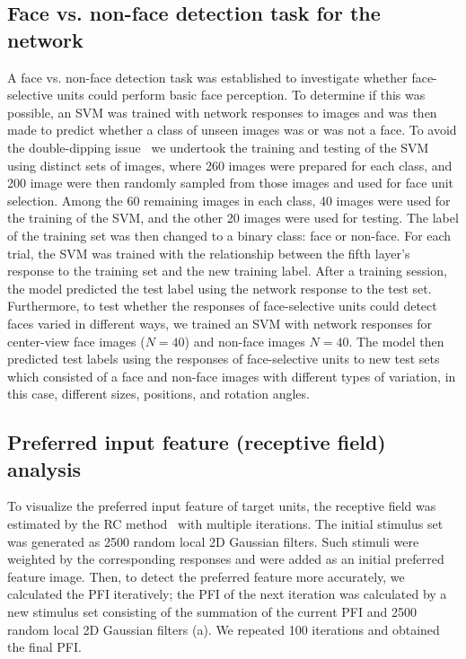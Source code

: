 \documentclass[final,3p,times,twocolumn]{elsarticle}
\begin{document}
\subsection{Face vs. non-face detection task for the network}
A face vs. non-face detection task was established to investigate whether face-selective units could perform basic face perception.
To determine if this was possible, an SVM was trained with network responses to images and was then made to predict whether a class of unseen images was or was not a face.
To avoid the double-dipping issue~\cite{kriegeskorte2009circular} we undertook the training and testing of the SVM using distinct sets of images, 
where 260 images were prepared for each class, 
and 200 image were then randomly sampled from those images and used for face unit selection.
Among the 60 remaining images in each class, 40 images were used for the training of the SVM, 
and the other 20 images were used for testing.
The label of the training set was then changed to a binary class: face or non-face.
For each trial, the SVM was trained with the relationship between the fifth layer's response to the training set and the new training label.
After a training session, the model predicted the test label using the network response to the test set.
Furthermore, to test whether the responses of face-selective units could detect faces varied in different ways, 
we trained an SVM with network responses for center-view face images ($ N = 40 $) and non-face images $ N = 40 $.
The model then predicted test labels using the responses of face-selective units to new test sets which consisted of a face and non-face images with different types of variation, in this case, different sizes, positions, and rotation angles.


\subsection{Preferred input feature (receptive field) analysis} \label{sec:preferred}
To visualize the preferred input feature of target units, the receptive field was estimated by the RC method~\cite{bonin2011local} with multiple iterations.
The initial stimulus set was generated as 2500 random local 2D Gaussian filters.
Such stimuli were weighted by the corresponding responses and were added as an initial preferred feature image.
Then, to detect the preferred feature more accurately, we calculated the PFI iteratively;
the PFI of the next iteration was calculated by a new stimulus set consisting of the summation of the current PFI and 2500 random local 2D Gaussian filters (a).
We repeated 100 iterations and obtained the final PFI.
\end{document}
